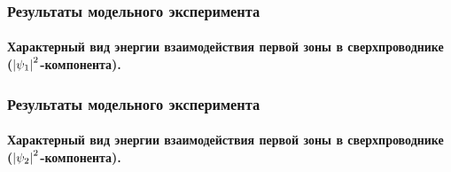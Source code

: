 \begin{frame}
    \frametitle{Результаты модельного эксперимента}
    \framesubtitle{Характерный вид энергии взаимодействия первой зоны в 
        сверхпроводнике (\( \left| \psi_1 \right|^2 \)-компонента).}
    \begin{figure}[h]
        \begin{minipage}[h]{0.49\linewidth}
            \center{\texttt{[image: 3d\_F1]}}
        \end{minipage}
        \hfill
        \begin{minipage}[h]{0.49\linewidth}
        \end{minipage}
    \end{figure}
\end{frame}

\begin{frame}
    \frametitle{Результаты модельного эксперимента}
    \framesubtitle{Характерный вид энергии взаимодействия первой зоны в 
        сверхпроводнике (\( \left| \psi_2 \right|^2 \)-компонента).}
    \begin{figure}[h]
        \begin{minipage}[h]{0.49\linewidth}
            \center{\texttt{[image: 3d\_F2]}}
        \end{minipage}
        \hfill
        \begin{minipage}[h]{0.49\linewidth}
        \end{minipage}
    \end{figure}
\end{frame}